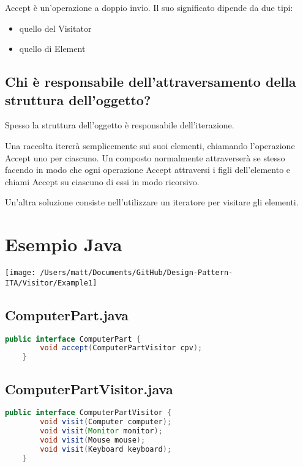 Accept è un'operazione a doppio invio. Il suo significato dipende da due tipi:

\begin{itemize}
    \item quello del Visitator
    \item quello di Element
\end{itemize}

\subsection{Chi è responsabile dell'attraversamento della struttura dell'oggetto?}
Spesso la struttura dell'oggetto è responsabile dell'iterazione.

Una raccolta itererà semplicemente sui suoi elementi, chiamando l'operazione Accept uno per ciascuno. Un composto normalmente attraverserà se stesso facendo in modo che ogni operazione Accept attraversi i figli dell'elemento e chiami Accept su ciascuno di essi in modo ricorsivo.

Un'altra soluzione consiste nell'utilizzare un iteratore per visitare gli elementi.


\section{Esempio Java}
\texttt{[image: /Users/matt/Documents/GitHub/Design-Pattern-ITA/Visitor/Example1]}

\subsection{ComputerPart.java}
\begin{lstlisting}[language=java]
    public interface ComputerPart {
        void accept(ComputerPartVisitor cpv);
    }
\end{lstlisting}

\subsection{ComputerPartVisitor.java}
\begin{lstlisting}[language=java]
    public interface ComputerPartVisitor {
        void visit(Computer computer);
        void visit(Monitor monitor);
        void visit(Mouse mouse);
        void visit(Keyboard keyboard);
    }
\end{lstlisting}

